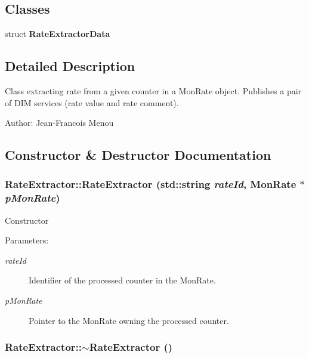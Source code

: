 \subsection*{Classes}
\begin{CompactItemize}
\item 
struct {\bf Rate\-Extractor\-Data}
\end{CompactItemize}


\subsection{Detailed Description}
Class extracting rate from a given counter in a Mon\-Rate object. Publishes a pair of DIM services (rate value and rate comment).

\begin{Desc}
\item[Author:]Jean-Francois Menou \end{Desc}




\subsection{Constructor \& Destructor Documentation}
\subsubsection{\setlength{\rightskip}{0pt plus 5cm}Rate\-Extractor::Rate\-Extractor (std::string {\em rate\-Id}, Mon\-Rate $\ast$ {\em p\-Mon\-Rate})}\label{classRateExtractor_a0}


Constructor

\begin{Desc}
\item[Parameters:]
\begin{description}
\item[{\em rate\-Id}]Identifier of the processed counter in the Mon\-Rate. \item[{\em p\-Mon\-Rate}]Pointer to the Mon\-Rate owning the processed counter. \end{description}
\end{Desc}
\subsubsection{\setlength{\rightskip}{0pt plus 5cm}Rate\-Extractor::$\sim${\bf Rate\-Extractor} ()}\label{classRateExtractor_a1}


